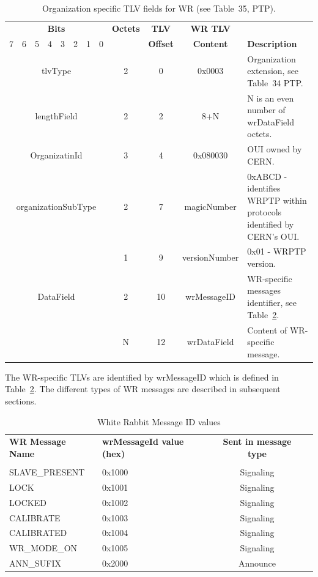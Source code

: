 \documentclass[a4paper, 12pt]{article}
\begin{document}
\begin{table}[h!]
\caption{Organization specific TLV fields for WR (see Table~35, PTP).}
\centering
\begin{tabular}{| c | c | c | c | c | c | c | c | c | c |c|  p{4.3cm}  |}
\hline
\multicolumn{8}{|c|}{\textbf{Bits}} & \textbf{Octets} & \textbf{TLV} & \textbf{WR TLV} & \\
\cline{0-7}
7 & 6 & 5 & 4 & 3 & 2 & 1 & 0 &  &  \textbf{Offset}  & \textbf{Content} & \textbf{Description} \\
\hline
\multicolumn{8}{|c|}{tlvType            } & 2 & 0  & 0x0003   & Organization extension, 
								see Table~34 PTP. \\ \hline
\multicolumn{8}{|c|}{lengthField        } & 2 & 2  & 8+N      & N is an even number of wrDataField
								octets. \\ \hline
\multicolumn{8}{|c|}{OrganizatinId      } & 3 & 4  & 0x080030 & OUI owned by CERN. \\
\hline
\multicolumn{8}{|c|}{organizationSubType} & 2 & 7  & magicNumber & 0xABCD - identifies WRPTP 
						      within protocols identified by CERN's OUI. \\
\cline{9-12} %
\multicolumn{8}{|c|}{}                    & 1 & 9  & versionNumber& 0x01 - WRPTP version.\\
 \hline
\multicolumn{8}{|c|}{DataField}           & 2 & 10 & wrMessageID  & WR-specific messages identifier,
								    see Table~\ref{tab:wrMessageId}. \\
\cline{9-12} %
\multicolumn{8}{|c|}{  }                 & N & 12 & wrDataField   & Content of WR-specific message. \\
\hline
\end{tabular}
\label{tab:wrTLVtype}
\end{table}
The WR-specific TLVs are identified by wrMessageID which is defined in 
Table~\ref{tab:wrMessageId}. The different types of WR messages are described in subsequent 
sections.

\begin{table}[tbp]
\caption{White Rabbit Message ID values}
\centering
\begin{tabular}{| l | p{2.5cm} | c | c |}          \hline
\textbf{WR Message Name}  &  \textbf{wrMessageId value (hex)} &  \textbf{Sent in message type} \\ 
& &  \\ \hline
SLAVE\_PRESENT     &  0x1000 & Signaling \\ \hline
LOCK               &  0x1001 & Signaling \\ \hline
LOCKED             &  0x1002 & Signaling \\ \hline
CALIBRATE          &  0x1003 & Signaling \\ \hline
CALIBRATED         &  0x1004 & Signaling \\ \hline
WR\_MODE\_ON       &  0x1005 & Signaling \\ \hline
ANN\_SUFIX	   &  0x2000 & Announce  \\ \hline
\end{tabular}
\label{tab:wrMessageId}
\end{table}
\end{document}
